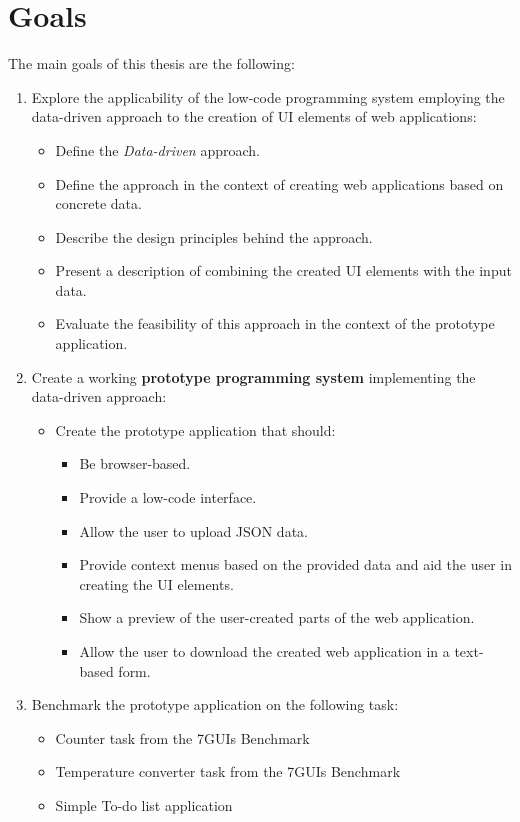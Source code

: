 \section*{Goals}
The main goals of this thesis are the following:
\begin{enumerate}
	\item Explore the applicability of the low-code programming system employing the data-driven approach to the creation of UI elements of web applications:
	      \begin{itemize}
		      \item Define the \emph{Data-driven} approach.
		      \item Define the approach in the context of creating web applications based on concrete data.
		      \item Describe the design principles behind the approach.
		      \item Present a description of combining the created UI elements with the input data.
		      \item Evaluate the feasibility of this approach in the context of the prototype application.
	      \end{itemize}
	\item Create a working \textbf{prototype programming system} implementing the data-driven approach:
	      \begin{itemize}
		      \item Create the prototype application that should:
		            \begin{itemize}
			            \item Be browser-based.
			            \item Provide a low-code interface.
			            \item Allow the user to upload JSON data.
			            \item Provide context menus based on the provided data and aid the user in creating the UI elements.
			            \item Show a preview of the user-created parts of the web application.
			            \item Allow the user to download the created web application in a text-based form.
		            \end{itemize}
	      \end{itemize}
	\item Benchmark the prototype application on the following task:
	      \begin{itemize}
		      \item Counter task from the 7GUIs Benchmark
		      \item Temperature converter task from the 7GUIs Benchmark
		      \item Simple To-do list application

	      \end{itemize}
\end{enumerate}


